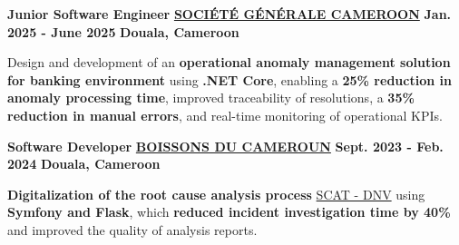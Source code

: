 

\begin{cventries}

  \cventry
    {\textbf{Junior Software Engineer}} %
    {\textbf{\href{https://particuliers.societegenerale.cm/fr/}{SOCIÉTÉ GÉNÉRALE CAMEROON}}} %
    {\textbf{Jan. 2025 - June 2025}} %
    {\textbf{Douala, Cameroon}} %
    {
      \begin{cvitems} %
        \item {Design and development of an \textbf{operational anomaly management solution for banking environment} using \textbf{.NET Core}, enabling a \textbf{25\% reduction in anomaly processing time}, improved traceability of resolutions, a \textbf{35\% reduction in manual errors}, and real-time monitoring of operational KPIs.}
      \end{cvitems}
    }

  \cventry
    {\textbf{Software Developer}} %
    {\textbf{\href{https://boissonsducameroun.com/}{BOISSONS DU CAMEROUN}}} %
    {\textbf{Sept. 2023 - Feb. 2024}} %
    {\textbf{Douala, Cameroon}} %
    {
      \begin{cvitems} %
        \item {\textbf{Digitalization of the root cause analysis process} \href{https://www.dnv.com/energy/services/international-sustainability-rating-system/systematic-cause-analysis-techniques/}{SCAT - DNV} using \textbf{Symfony and Flask}, which \textbf{reduced incident investigation time by 40\%} and improved the quality of analysis reports.}
      \end{cvitems}
    }


\end{cventries}
